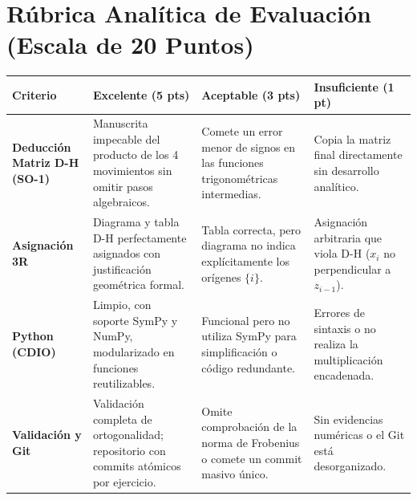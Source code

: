 \documentclass[11pt, a4paper]{article}
\begin{document}
\newpage
\section{Rúbrica Analítica de Evaluación (Escala de 20 Puntos)}
\begin{table}[h!]
    \centering
    \renewcommand{\arraystretch}{1.3}
    \begin{tabularx}{\textwidth}{@{} >{\raggedright\arraybackslash}p{2.8cm} X X X @{}}
    \toprule
    \textbf{Criterio} & \textbf{Excelente (5 pts)} & \textbf{Aceptable (3 pts)} & \textbf{Insuficiente (1 pt)} \\ \midrule
    \textbf{Deducción Matriz D-H (SO-1)} & Manuscrita impecable del producto de los 4 movimientos sin omitir pasos algebraicos. & Comete un error menor de signos en las funciones trigonométricas intermedias. & Copia la matriz final directamente sin desarrollo analítico. \\ 
    \textbf{Asignación 3R} & Diagrama y tabla D-H perfectamente asignados con justificación geométrica formal. & Tabla correcta, pero diagrama no indica explícitamente los orígenes $\{i\}$. & Asignación arbitraria que viola D-H ($x_i$ no perpendicular a $z_{i-1}$). \\ 
    \textbf{Python (CDIO)} & Limpio, con soporte SymPy y NumPy, modularizado en funciones reutilizables. & Funcional pero no utiliza SymPy para simplificación o código redundante. & Errores de sintaxis o no realiza la multiplicación encadenada. \\ 
    \textbf{Validación y Git} & Validación completa de ortogonalidad; repositorio con commits atómicos por ejercicio. & Omite comprobación de la norma de Frobenius o comete un commit masivo único. & Sin evidencias numéricas o el Git está desorganizado. \\ \bottomrule
    \end{tabularx}
\end{table}

\end{document}
